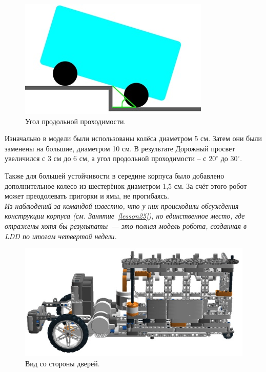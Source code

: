 \begin{figure}[h!]
	\begin{center}
		\includegraphics[width=1\linewidth]{chapters/chapter27/images/2}
		\caption{Угол продольной проходимости.}
		\label{ris:image27x2}
	\end{center}
\end{figure}	

Изначально в модели были использованы колёса диаметром 5 см. Затем они были заменены на большие, диаметром 10 см. В результате Дорожный просвет увеличился с 3 см до 6 см, а угол продольной проходимости – с \(20^\circ\) до \(30^\circ\). 

Также для большей устойчивости в середине корпуса было добавлено дополнительное колесо из шестерёнок диаметром 1,5 см. За счёт этого робот может преодолевать пригорки и ямы, не прогибаясь.\\
{\slshape Из наблюдений за командой известно, что у них происходили обсуждения конструкции корпуса (см. Занятие~\ref{lesson25}), но единственное место, где отражены хотя бы результаты~--- это полная модель робота, созданная в LDD по итогам четвертой недели.}

\begin{figure}[h!]
	\begin{center}
		\includegraphics[width=1\linewidth]{chapters/chapter27/images/3}
		\caption{Вид со стороны дверей.}
		\label{ris:image27x3}
	\end{center}
\end{figure}

